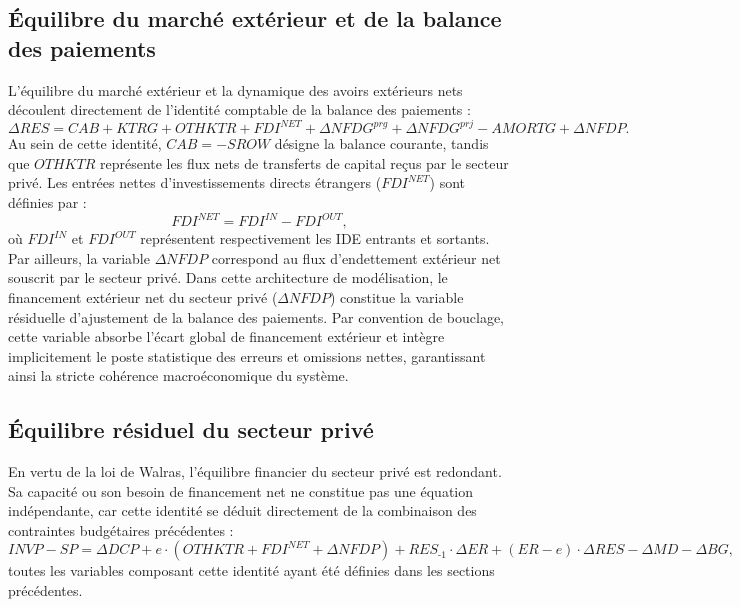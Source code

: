 \documentclass[11pt,a4paper]{article}
\newcommand{\CAB}{\mathit{CAB}}
\newcommand{\SROW}{\mathit{SROW}}
\newcommand{\KTRG}{\mathit{KTRG}}
\newcommand{\NFDG}{\mathit{NFDG}}
\newcommand{\BG}{\mathit{BG}}
\newcommand{\AMORTG}{\mathit{AMORTG}}
\newcommand{\SP}{\mathit{SP}}
\newcommand{\RES}{\mathit{RES}}
\newcommand{\OTHKTR}{\mathit{OTHKTR}}
\newcommand{\FDI}{\mathit{FDI}}
\newcommand{\NFDP}{\mathit{NFDP}}
\newcommand{\MD}{\mathit{MD}}
\newcommand{\DCP}{\mathit{DCP}}
\newcommand{\INVP}{\mathit{INVP}}
\newcommand{\ER}{\mathit{ER}}
\begin{document}
	\subsection{Équilibre du marché extérieur et de la balance des paiements}
	L'équilibre du marché extérieur et la dynamique des avoirs extérieurs nets découlent directement de l'identité comptable de la balance des paiements : 
	\begin{equation*}
		\Delta\RES = \CAB + \KTRG + \OTHKTR + \FDI^{\textit{NET}} + \Delta\NFDG^{\mathit{prg}} + \Delta\NFDG^{\mathit{prj}} - \AMORTG + \Delta\NFDP.
	\end{equation*}
	Au sein de cette identité, $\CAB = -\SROW$ désigne la balance courante, tandis que $\OTHKTR$ représente les flux nets de transferts de capital reçus par le secteur privé. Les entrées nettes d'investissements directs étrangers ($\FDI^{\mathit{NET}}$) sont définies par :
	\begin{equation*}
		\FDI^{\mathit{NET}} = \FDI^{\mathit{IN}} - \FDI^{\mathit{OUT}},
	\end{equation*}
	où $\FDI^{\mathit{IN}}$ et $\FDI^{\mathit{OUT}}$ représentent respectivement les IDE entrants et sortants. Par ailleurs, la variable $\Delta\NFDP$ correspond au flux d'endettement extérieur net souscrit par le secteur privé. Dans cette architecture de modélisation, le financement extérieur net du secteur privé ($\Delta\NFDP$) constitue la variable résiduelle d'ajustement de la balance des paiements. Par convention de bouclage, cette variable absorbe l'écart global de financement extérieur et intègre implicitement le poste statistique des erreurs et omissions nettes, garantissant ainsi la stricte cohérence macroéconomique du système.
	
	\subsection{Équilibre résiduel du secteur privé}
	En vertu de la loi de Walras, l'équilibre financier du secteur privé est redondant. Sa capacité ou son besoin de financement net ne constitue pas une équation indépendante, car cette identité se déduit directement de la combinaison des contraintes budgétaires précédentes :
	\begin{equation*}
		\INVP - \SP = \Delta\DCP + e \cdot \left(\OTHKTR + \FDI^{\textit{NET}} + \Delta\NFDP\right) + \RES_{\textit{-1}} \cdot \Delta\ER + (\ER - e) \cdot \Delta\RES - \Delta\MD - \Delta\BG,
	\end{equation*}
	toutes les variables composant cette identité ayant été définies dans les sections précédentes.
	
\end{document}
